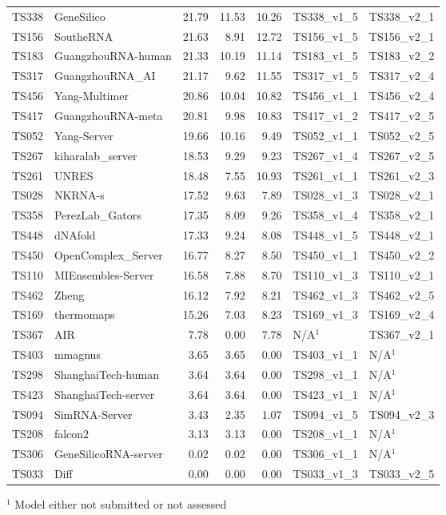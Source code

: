\begin{table}[ht]
{\begin{tabular}{llrrrll}
TS338 & GeneSilico & 21.79 & 11.53 & 10.26 & TS338\_v1\_5 & TS338\_v2\_1 \\ 
TS156 & SoutheRNA & 21.63 & 8.91 & 12.72 & TS156\_v1\_5 & TS156\_v2\_1 \\ 
TS183 & GuangzhouRNA-human & 21.33 & 10.19 & 11.14 & TS183\_v1\_5 & TS183\_v2\_2 \\ 
TS317 & GuangzhouRNA\_AI & 21.17 & 9.62 & 11.55 & TS317\_v1\_5 & TS317\_v2\_4 \\ 
TS456 & Yang-Multimer & 20.86 & 10.04 & 10.82 & TS456\_v1\_1 & TS456\_v2\_4 \\ 
TS417 & GuangzhouRNA-meta & 20.81 & 9.98 & 10.83 & TS417\_v1\_2 & TS417\_v2\_5 \\ 
TS052 & Yang-Server & 19.66 & 10.16 & 9.49 & TS052\_v1\_1 & TS052\_v2\_5 \\ 
TS267 & kiharalab\_server & 18.53 & 9.29 & 9.23 & TS267\_v1\_4 & TS267\_v2\_5 \\ 
TS261 & UNRES & 18.48 & 7.55 & 10.93 & TS261\_v1\_1 & TS261\_v2\_3 \\ 
TS028 & NKRNA-s & 17.52 & 9.63 & 7.89 & TS028\_v1\_3 & TS028\_v2\_1 \\ 
TS358 & PerezLab\_Gators & 17.35 & 8.09 & 9.26 & TS358\_v1\_4 & TS358\_v2\_1 \\ 
TS448 & dNAfold & 17.33 & 9.24 & 8.08 & TS448\_v1\_5 & TS448\_v2\_1 \\ 
TS450 & OpenComplex\_Server & 16.77 & 8.27 & 8.50 & TS450\_v1\_1 & TS450\_v2\_2 \\ 
TS110 & MIEnsembles-Server & 16.58 & 7.88 & 8.70 & TS110\_v1\_3 & TS110\_v2\_1 \\ 
TS462 & Zheng & 16.12 & 7.92 & 8.21 & TS462\_v1\_3 & TS462\_v2\_5 \\ 
TS169 & thermomaps & 15.26 & 7.03 & 8.23 & TS169\_v1\_3 & TS169\_v2\_4 \\ 
TS367 & AIR & 7.78 & 0.00 & 7.78 & N/A$^{1}$ & TS367\_v2\_1 \\ 
TS403 & mmagnus & 3.65 & 3.65 & 0.00 & TS403\_v1\_1 & N/A$^{1}$ \\ 
TS298 & ShanghaiTech-human & 3.64 & 3.64 & 0.00 & TS298\_v1\_1 & N/A$^{1}$ \\ 
TS423 & ShanghaiTech-server & 3.64 & 3.64 & 0.00 & TS423\_v1\_1 & N/A$^{1}$ \\ 
TS094 & SimRNA-Server & 3.43 & 2.35 & 1.07 & TS094\_v1\_5 & TS094\_v2\_3 \\ 
TS208 & falcon2 & 3.13 & 3.13 & 0.00 & TS208\_v1\_1 & N/A$^{1}$ \\ 
TS306 & GeneSilicoRNA-server & 0.02 & 0.02 & 0.00 & TS306\_v1\_1 & N/A$^{1}$ \\ 
TS033 & Diff & 0.00 & 0.00 & 0.00 & TS033\_v1\_3 & TS033\_v2\_5 \\ 
\bottomrule
\end{tabular}%
}
\begin{flushleft}\footnotesize $^{1}$ Model either not submitted or not assessed\end{flushleft}
\end{table}

